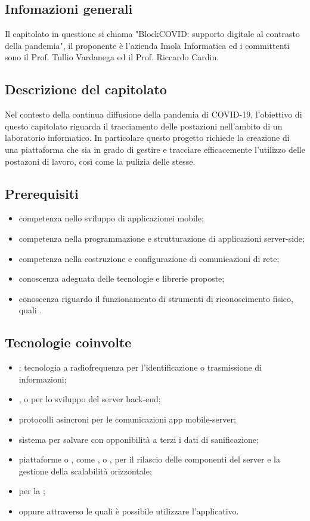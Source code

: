 
\subsection{Infomazioni generali}
Il capitolato in questione si chiama "BlockCOVID: supporto digitale al contrasto della pandemia", il proponente è l'azienda Imola Informatica ed i committenti sono il Prof. Tullio Vardanega ed il Prof. Riccardo Cardin.

\subsection{Descrizione del capitolato}
Nel contesto della continua diffusione della pandemia di COVID-19, l'obiettivo di questo capitolato riguarda il tracciamento delle postazioni nell'ambito di un laboratorio informatico. In particolare questo progetto richiede la creazione di una piattaforma che sia in grado di gestire e tracciare efficacemente l'utilizzo delle postazoni di lavoro, così come la pulizia delle stesse.

\subsection{Prerequisiti}
\begin{itemize}
\item competenza nello sviluppo di applicazionei mobile;
\item competenza nella programmazione e strutturazione di applicazioni server-side;
\item competenza nella costruzione e configurazione di comunicazioni di rete;
\item conoscenza adeguata delle tecnologie e librerie proposte;
\item conoscenza riguardo il funzionamento di strumenti di riconoscimento fisico, quali .
\end{itemize}

\subsection{Tecnologie coinvolte}
\begin{itemize}
\item {}: tecnologia a radiofrequenza per l'identificazione o trasmissione di informazioni;
\item {},  o  per lo sviluppo del server back-end;
\item protocolli asincroni per le comunicazioni app mobile-server;
\item sistema  per salvare con opponibilità a terzi i dati di sanificazione;
\item piattaforme  o , come ,  o , per il rilascio delle componenti del server e la gestione della scalabilità orizzontale;
\item {} per la ;
\item {} oppure  attraverso le quali è possibile utilizzare l'applicativo.
\end{itemize}

